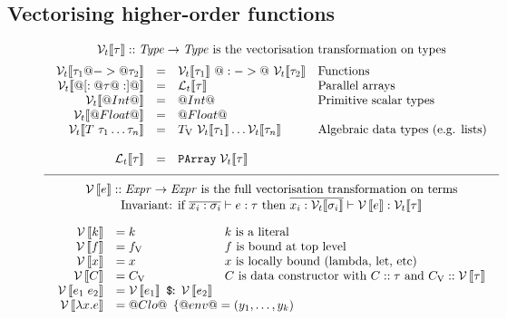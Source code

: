 \subsection{Vectorising higher-order functions}
\label{sec:vect-trafo}

\begin{figure*}
$$\begin{array}{c}
\mbox{$\TT{\tau}:: \mathit{Type} \to \mathit{Type}$ 
is the vectorisation transformation on types} \\[2mm]
\begin{array}{rcll}
\TT{\tau_1 @->@ \tau_2} & = & \TT{\tau_1}~ @:->@~\TT{\tau_2}  & \mbox{Functions} \\
\TT{@[:@\tau@:]@}    & = & \TTL{\tau} & \mbox{Parallel arrays} \\
\TT{@Int@} & = & @Int@  & \mbox{Primitive scalar types}\\
\TT{@Float@} & = & @Float@ \\
\TT{T~\tau_1 \ldots \tau_n} & = & \VV{T}~\TT{\tau_1}\ldots \TT{\tau_n} & \mbox{Algebraic data types (e.g. lists)}
\\ \\
\TTL{\tau} & = & \pa{\TT{\tau}} 
\end{array} \\ \\[-2mm]
\hline \\[-2mm]
\mbox{$\VT{e}::\mathit{Expr} \to \mathit{Expr}$ 
is the full vectorisation transformation on terms} \\
\mbox{Invariant: if $\tup{x_i : \sigma_i} \vdash e:\tau$ then 
      $\tup{x_i:\TT{\sigma_i}} \vdash \VT{e}:\TT{\tau}$}\\[1em]
\begin{array}{rll}
\VT{k}       & = k & \mbox{$k$ is a literal} \\       
\VT{f}       & = \VV{f} & \mbox{$f$ is bound at top level} \\
\VT{x}       & = x     & \mbox{$x$ is locally bound (lambda, let, etc)} \\
\VT{C}       & = \VV{C}     & \mbox{$C$ is data constructor with $ C :: \tau$ and $\VV{C} :: \VT{\tau}$} \\
\VT{e_1 \; e_2} & = \VT{e_1} ~\capp~ \VT{e_2} \\
\VT{\lambda{x}.e} 
  & \multicolumn{2}{l}{= @Clo@\begin{array}[t]{l} 
              \{ @env@ = (y_1,\dots,y_k) \\

\end{array}}
\end{array}
\end{array}$$
\end{figure*}
